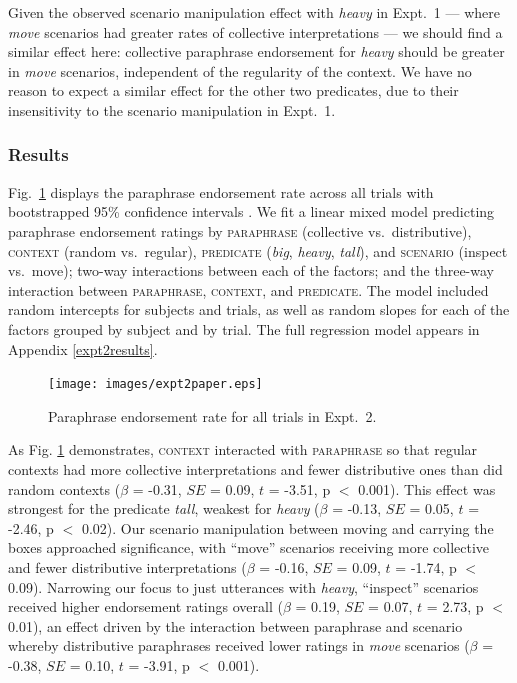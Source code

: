 \documentclass[linguex]{sp}
\begin{document}
Given the observed scenario manipulation effect with \emph{heavy} in Expt.~1 --- where \emph{move} scenarios had greater rates of collective interpretations --- we should find a similar effect here: collective paraphrase endorsement for \emph{heavy} should be greater in \emph{move} scenarios, independent of the regularity of the context. We have no reason to expect a similar effect for the other two predicates, due to their insensitivity to the scenario manipulation in Expt.~1.

\subsubsection{Results}


Fig.\ \ref{resultsexpt2} displays the paraphrase endorsement rate across all trials with bootstrapped 95\% confidence intervals \citep{diciccioefron1996}. We fit a linear mixed model predicting paraphrase endorsement ratings by \textsc{paraphrase} (collective vs.~distributive), \textsc{context} (random vs.~regular),
\textsc{predicate} (\emph{big}, \emph{heavy}, \emph{tall}),
and \textsc{scenario} (inspect vs.~move); two-way interactions between each of the factors; and the three-way interaction between \textsc{paraphrase}, \textsc{context}, and \textsc{predicate}. The model included random intercepts for subjects and trials, as well as random slopes for each of the factors grouped by subject and by trial. The full regression model appears in Appendix \ref{expt2results}.

\begin{figure}[h!]
\centering
\texttt{[image: images/expt2paper.eps]} 
\vspace{-15pt}
\caption{Paraphrase endorsement rate for all trials in Expt.~2.}\label{resultsexpt2}
\end{figure}

As Fig. \ref{resultsexpt2} demonstrates, \textsc{context} interacted with \textsc{paraphrase} so that regular contexts had more collective interpretations and fewer distributive ones than did random contexts ($\beta$ = -0.31, $SE$ = 0.09, $t$ = -3.51, p $<$ 0.001). This effect was strongest for the predicate \emph{tall}, weakest for \emph{heavy} ($\beta$ = -0.13, $SE$ = 0.05, $t$ = -2.46, p $<$ 0.02). Our scenario manipulation between moving and carrying the boxes approached significance, with ``move'' scenarios receiving more collective and fewer distributive interpretations ($\beta$ = -0.16, $SE$ = 0.09, $t$ = -1.74, p $<$ 0.09). Narrowing our focus to just utterances with \emph{heavy}, ``inspect'' scenarios received higher endorsement ratings overall ($\beta$ = 0.19, $SE$ = 0.07, $t$ = 2.73, p $<$ 0.01), an effect driven by the interaction between paraphrase and scenario whereby distributive paraphrases received lower ratings in \emph{move} scenarios ($\beta$ = -0.38, $SE$ = 0.10, $t$ = -3.91, p $<$ 0.001).
\end{document}
